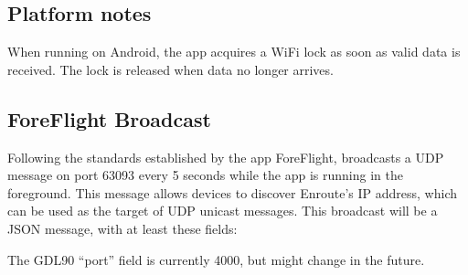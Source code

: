 \documentclass[letterpaper,10pt,english]{sphinxmanual}
\begin{document}
\subsection{Platform notes}
\label{\detokenize{04-appendix/technical:platform-notes}}
\sphinxAtStartPar
When running on Android, the app acquires a Wi\sphinxhyphen{}Fi lock as soon as valid data is
received.  The lock is released when data no longer arrives.


\subsection{ForeFlight Broadcast}
\label{\detokenize{04-appendix/technical:foreflight-broadcast}}
\sphinxAtStartPar
Following the standards established by the app ForeFlight,  broadcasts a UDP message on port 63093 every 5 seconds while the
app is running in the foreground.  This message allows devices to discover
Enroute’s IP address, which can be used as the target of UDP unicast messages.
This broadcast will be a JSON message, with at least these fields:

\begin{sphinxVerbatim}[commandchars=\\\{\}]
\end{sphinxVerbatim}

\sphinxAtStartPar
The GDL90 “port” field is currently 4000, but might change in the future.



\renewcommand{\indexname}{Index}
\footnotesize\raggedright\printindex
\end{document}
